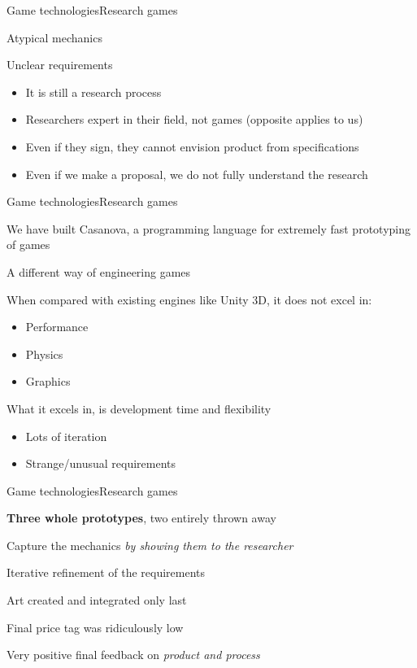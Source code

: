 \documentclass{beamer}
\begin{document}
\begin{slide}{Game technologies}{Research games}{
\item Atypical mechanics
\item Unclear requirements
\begin{itemize}
\item It is still a research process
\item Researchers expert in their field, not games (opposite applies to us)
\item Even if they sign, they cannot envision product from specifications
\item Even if we make a proposal, we do not fully understand the research
\end{itemize}
}\end{slide}

\begin{slide}{Game technologies}{Research games}{
\item We have built Casanova, a programming language for extremely fast prototyping of games \cite{CASANOVA}
\item A different way of engineering games
\item When compared with existing engines like Unity 3D, it does not excel in:
\begin{itemize}
\item Performance
\item Physics
\item Graphics
\end{itemize}
\item What it excels in, is development time and flexibility
\begin{itemize}
\item Lots of iteration
\item Strange/unusual requirements
\end{itemize}
}\end{slide}

\begin{slide}{Game technologies}{Research games}{
\item \textbf{Three whole prototypes}, two entirely thrown away
\item Capture the mechanics \textit{by showing them to the researcher}
\item Iterative refinement of the requirements
\item Art created and integrated only last
\item Final price tag was ridiculously low
\item Very positive final feedback on \textit{product and process}
}\end{slide}
\end{document}
